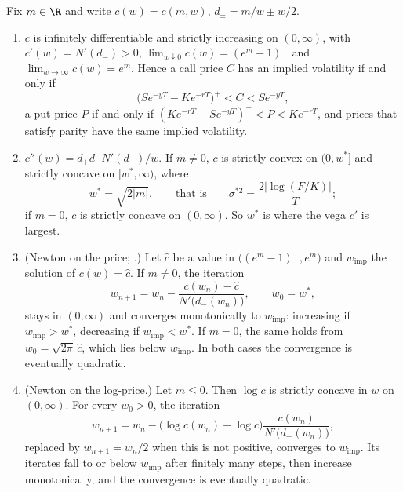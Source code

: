 \begin{proposition}\label{prop:bsf-implied-vol}
Fix $m\in\R$ and write $c(w)=c(m,w)$, $d_\pm=m/w\pm w/2$.
\begin{enumerate}[label=(\roman*)]
  \item $c$ is infinitely differentiable and strictly increasing on $(0,\infty)$, with
    $c'(w)=N'(d_-)>0$, $\lim_{w\downarrow0}c(w)=(e^m-1)^+$ and $\lim_{w\to\infty}c(w)=e^m$. Hence a call
    price $C$ has an implied volatility if and only if
    \begin{equation}\label{eq:bsf-iv-bounds}
      \big(Se^{-yT}-Ke^{-rT}\big)^+<C<Se^{-yT},
    \end{equation}
    a put price $P$ if and only if $(Ke^{-rT}-Se^{-yT})^+<P<Ke^{-rT}$, and prices that satisfy parity have
    the same implied volatility.
  \item $c''(w)=d_+d_-N'(d_-)/w$. If $m\ne0$, $c$ is strictly convex on $(0,w^*]$ and strictly concave on
    $[w^*,\infty)$, where
    \[
      w^*=\sqrt{2|m|},\qquad\text{that is}\qquad \sigma^{*2}=\frac{2|\log(F/K)|}{T};
    \]
    if $m=0$, $c$ is strictly concave on $(0,\infty)$. So $w^*$ is where the vega $c'$ is largest.
  \item (Newton on the price; \textcite{manaster-koehler}.) Let $\hat c$ be a value in $\big((e^m-1)^+,e^m\big)$ and $w_{\mathrm{imp}}$ the
    solution of $c(w)=\hat c$. If $m\ne0$, the iteration
    \[
      w_{n+1}=w_n-\frac{c(w_n)-\hat c}{N'\big(d_-(w_n)\big)},\qquad w_0=w^*,
    \]
    stays in $(0,\infty)$ and converges monotonically to $w_{\mathrm{imp}}$: increasing if
    $w_{\mathrm{imp}}>w^*$, decreasing if $w_{\mathrm{imp}}<w^*$. If $m=0$, the same holds from
    $w_0=\sqrt{2\pi}\,\hat c$, which lies below $w_{\mathrm{imp}}$. In both cases the convergence is
    eventually quadratic.
  \item (Newton on the log-price.) Let $m\le0$. Then $\log c$ is strictly concave in $w$ on $(0,\infty)$. For every
    $w_0>0$, the iteration
    \[
      w_{n+1}=w_n-\big(\log c(w_n)-\log\hat c\big)\frac{c(w_n)}{N'\big(d_-(w_n)\big)},
    \]
    replaced by $w_{n+1}=w_n/2$ when this is not positive, converges to $w_{\mathrm{imp}}$. Its iterates fall to or below $w_{\mathrm{imp}}$ after finitely many steps,
    then increase monotonically, and the convergence is eventually quadratic.
\end{enumerate}
\end{proposition}

